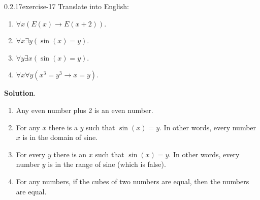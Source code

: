 \documentclass[twoside,11pt,]{book}
\numberwithin{equation}{chapter}
\newcommand{\imp}{\rightarrow}
\begin{document}
\begin{divisionsolution}{0.2.17}{}{exercise-17}%
\hypertarget{p-383}{}%
Translate into English:\leavevmode%
\begin{enumerate}[label=(\alph*)]
\item\hypertarget{li-419}{}\(\forall x (E(x) \imp E(x +2))\).%
\item\hypertarget{li-420}{}\(\forall x \exists y (\sin(x) = y)\).%
\item\hypertarget{li-421}{}\(\forall y \exists x (\sin(x) = y)\).%
\item\hypertarget{li-422}{}\(\forall x \forall y (x^3 = y^3 \imp x = y)\).%
\end{enumerate}
%
\par\smallskip%
\noindent\textbf{Solution}.\quad%
\hypertarget{p-384}{}%
\leavevmode%
\begin{enumerate}[label=(\alph*)]
\item\hypertarget{li-423}{}\hypertarget{p-385}{}%
Any even number plus 2 is an even number.%
\item\hypertarget{li-424}{}\hypertarget{p-386}{}%
For any \(x\) there is a \(y\) such that \(\sin(x) = y\). In other words, every number \(x\) is in the domain of sine.%
\item\hypertarget{li-425}{}\hypertarget{p-387}{}%
For every \(y\) there is an \(x\) such that \(\sin(x) = y\). In other words, every number \(y\) is in the range of sine (which is false).%
\item\hypertarget{li-426}{}\hypertarget{p-388}{}%
For any numbers, if the cubes of two numbers are equal, then the numbers are equal.%
\end{enumerate}
%
\end{divisionsolution}%
\end{document}

